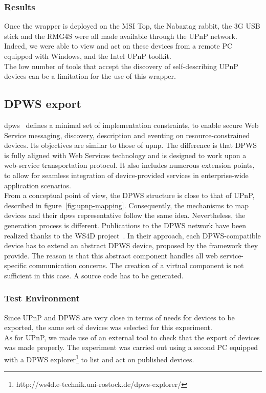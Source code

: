 \subsubsection{Results}

Once the wrapper is deployed on the MSI Top, the Nabaztag rabbit, the 3G USB stick and the RMG4S were all made available through the UPnP network. Indeed, we were able to view and act on these devices from a remote PC equipped with Windows, and the Intel UPnP toolkit.\\
The low number of tools that accept the discovery of self-describing UPnP devices can be a limitation for the use of this wrapper.


\subsection{DPWS export}


\gls{dpws}~\cite{DPWS} defines a minimal set of implementation constraints, to enable secure Web Service messaging, discovery, description and eventing on resource-constrained devices. Its objectives are similar to those of \gls{upnp}. The difference is that DPWS is fully aligned with Web Services technology and is designed to work upon a web-service transportation protocol. It also includes numerous extension points, to allow for seamless integration of device-provided services in enterprise-wide application scenarios.\\
From a conceptual point of view, the DPWS structure is close to that of UPnP, described in figure~\ref{fig:upnp-mapping}. Consequently, the mechanisms to map \enti{} devices and their \gls{dpws} representative follow the same idea. Nevertheless, the generation process is different. Publications to the DPWS network have been realized thanks to the WS4D project~\cite{ws4d}. In their approach, each DPWS-compatible device has to extend an abstract DPWS device, proposed by the framework they provide. The reason is that this abstract component handles all web service-specific communication concerns. The creation of a virtual component is not sufficient in this case. A source code has to be generated.\\

\subsubsection{Test Environment}

Since UPnP and DPWS are very close in terms of needs for devices to be exported, the same set of devices was selected for this experiment.\\
As for UPnP, we made use of an external tool to check that the export of devices was made properly. The experiment was carried out using a second PC equipped with a DPWS explorer\footnote{http://ws4d.e-technik.uni-rostock.de/dpws-explorer/} to list and act on published devices.

